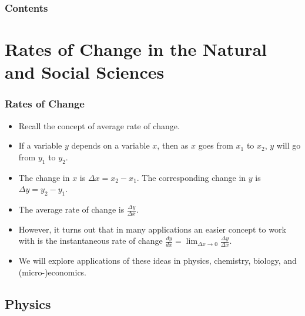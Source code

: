\documentclass[serif,ignorenonframetext]{beamer}
\title{\commonTitleZeroTwoSeven}
\subtitle{\commonSubtitleZeroTwoSeven}
\author{\commonAuthor}
\institute{\commonInstitute}
\date{\commonDateZeroTwoSeven}
\newcommand{\ds}{\displaystyle}
\begin{document}

\begin{frame}
  \titlepage
\end{frame}

\begin{frame}
  \frametitle{Contents}
  \tableofcontents
\end{frame}


\section{Rates of Change in the Natural and Social Sciences}

\begin{frame}
  \frametitle{Rates of Change}
  \begin{itemize}[<+->]
  \item Recall the concept of average rate of change.
  \item If a variable $y$ depends on a variable $x$, then as $x$ goes
    from $x_1$ to $x_2$, $y$ will go from $y_1$ to $y_2$.
  \item The change in $x$ is $\Delta x = x_2-x_1$.  The corresponding
    change in $y$ is $\Delta y = y_2-y_1$.
  \item The average rate of change is $\ds \frac{\Delta y}{\Delta x}$.
  \item However, it turns out that in many applications an easier concept to 
    work with is the instantaneous rate of change
    $\ds \frac{dy}{dx} = \lim_{\Delta x\to 0} \frac{\Delta y}{\Delta x}$.
  \item We will explore applications of these ideas in physics, chemistry,
    biology, and (micro-)economics.
  \end{itemize}
\end{frame}


\subsection{Physics}
\end{document}

